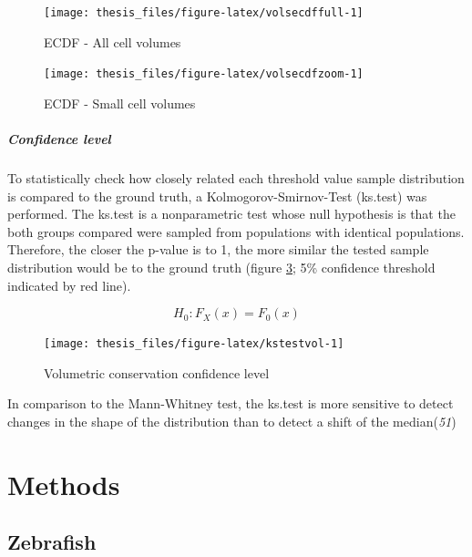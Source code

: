 \documentclass[11pt,singlespacinge,twoside]{reedthesis} %
\begin{document}
\begin{figure}

{\centering \texttt{[image: thesis\_files/figure-latex/volsecdffull-1]} 

}

\caption{ECDF - All cell volumes}\label{fig:volsecdffull}
\end{figure}

\begin{figure}

{\centering \texttt{[image: thesis\_files/figure-latex/volsecdfzoom-1]} 

}

\caption{ECDF - Small cell volumes}\label{fig:volsecdfzoom}
\end{figure}
\hypertarget{confidence-level}{%
\subparagraph{Confidence level}\label{confidence-level}}

To statistically check how closely related each threshold value sample distribution is compared to the ground truth, a Kolmogorov-Smirnov-Test (ks.test) was performed. The ks.test is a nonparametric test whose null hypothesis is that the both groups compared were sampled from populations with identical populations. Therefore, the closer the p-value is to 1, the more similar the tested sample distribution would be to the ground truth (figure \ref{fig:kstestvol}; 5\% confidence threshold indicated by red line).

\[H_{0} : F_X(x)=F_0(x)\]


\begin{figure}

{\centering \texttt{[image: thesis\_files/figure-latex/kstestvol-1]} 

}

\caption{Volumetric conservation confidence level}\label{fig:kstestvol}
\end{figure}
\noindent In comparison to the Mann-Whitney test, the ks.test is more sensitive to detect changes in the shape of the distribution than to detect a shift of the median(\emph{51})

\hypertarget{met}{%
\section{Methods}\label{met}}

\hypertarget{Zeb-met}{%
\subsection{Zebrafish}\label{Zeb-met}}
\end{document}
